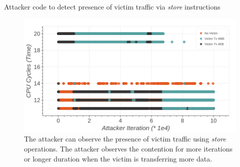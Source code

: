 \begin{minipage}{\textwidth}
    
    \captionsetup{type=lstlisting}
    \caption{Attacker code to detect presence of victim traffic via \textit{store} instructions}
    \label{lst:timing-victim-with-stores}
\end{minipage}

\begin{figure}[!htb]
    \centering
    \includegraphics[width=\columnwidth]{figures/interconnect-sc/store-ops/cpu_store_victim_observation.png}
    \caption{The attacker can observe the presence of victim traffic using \textit{store} operations.
    The attacker observes the contention for more iterations or longer duration when the victim is transferring more data.}
    \label{fig:cpu-store-victim-observation}
\end{figure}
